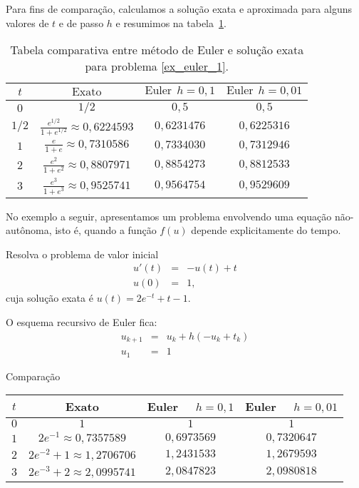 Para fins de comparação, calculamos a solução exata e aproximada para alguns valores de $t$ e de passo $h$ e resumimos na tabela~\ref{tab:log}.

\begin{table}
  \caption{Tabela comparativa entre método de Euler e solução exata para problema \ref{ex_euler_1}.}
  \label{tab:log}
  \begin{tabular}{|c|c|c|c|}\hline
    $t$ & $\text{Exato}$ & $\text{Euler}~~ h=0,1$ & $\text{Euler}~~ h=0,01$\\\hline
    $0$ & $1/2$ & $0,5$ & $0,5$\\\hline
    $1/2$ & $\frac{e^{1/2}}{1+e^{1/2}}\approx 0,6224593$ & $0,6231476$ & $0,6225316$\\\hline
    $1$ & $\frac{e}{1+e}\approx 0,7310586$ & $0,7334030$ & $0,7312946$\\\hline
    $2$ & $\frac{e^2}{1+e^2}\approx  0,8807971$ & $0,8854273$  & $0,8812533$ \\\hline
    $3$ & $\frac{e^3}{1+e^3}\approx   0,9525741$  & $0,9564754$ & $0,9529609$ \\\hline
  \end{tabular}
\end{table}


No exemplo a seguir, apresentamos um problema envolvendo uma equação não-autônoma, isto é, quando a função $f(u)$ depende explicitamente do tempo.

\begin{ex}
Resolva o problema de valor inicial
  \begin{eqnarray*}
    u'(t)&=&-u(t)+t\\
    u(0)&=&1,
  \end{eqnarray*}
cuja solução exata é $u(t)=2e^{-t}+t-1$.
\end{ex}
O esquema recursivo de Euler fica:
\begin{eqnarray*}
  u_{k+1}&=&u_k+h(-u_k+t_k)\\
  u_1&=&1
\end{eqnarray*}

Comparação
\begin{center}
\begin{tabular}{|c|c|c|c|}\hline
$t$ &  Exato & Euler~~ $h=0,1$ & Euler~~ $h=0,01$\\\hline
$0$ &  $1$ & $1$ & $1$\\\hline
$1$ &   $2e^{-1}\approx 0,7357589$ & $0,6973569$   &   $0,7320647$  \\\hline
$2$ &   $2e^{-2}+1\approx  1,2706706$ & $ 1,2431533 $   &  $ 1,2679593$     \\\hline
$3$ &   $2e^{-3}+2\approx 2,0995741$  & $ 2,0847823$ & $2,0980818$   \\\hline
\end{tabular}
\end{center}



